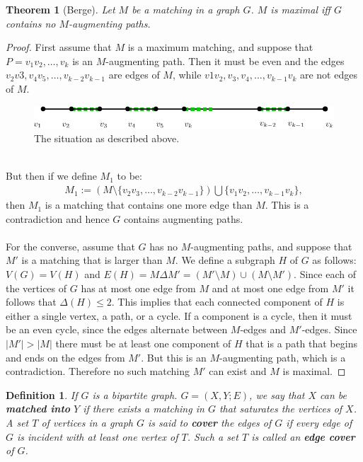 \documentclass[12pt,a4paper]{article}
\newtheorem{thm}{Theorem}[section]
\newtheorem{defn}{Definition}[section]
\theoremstyle{definition}
\begin{document}
\newpage
\begin{thm}[Berge] Let $M$ be a matching in a graph $G$. $M$ is maximal iff $G$ contains no $M$-augmenting paths. 
\end{thm}
\begin{proof}
First assume that $M$ is a maximum matching, and suppose that $P=v_1v_2, \dots , v_k$ is an $M$-augmenting path. Then it must be even and the edges $v_2v3,v_4v_5,\dots,v_{k-2}v_{k-1}$ are edges of $M$, while $v1v_2,v_3,v_4, \dots ,  v_{k-1}v_k$ are not edges of $M$. 
\\
\begin{figure}[hbtp]
\centering
\includegraphics[scale=.9]{images/graph43.pdf}
\caption{The situation as described above.}
\end{figure}
\\
But then if we define $M_1$ to be:
\begin{align*}
M_1:= ( M \setminus \{ v_2v_3, \dots , v_{k-2}v_{k-1}\} ) \bigcup \{ v_1v_2, \dots , v_{k-1}v_k\},
\end{align*}
then $M_1$ is a matching that contains one more edge than $M$. This is a contradiction and hence $G$ contains augmenting paths. 
\\\\
For the converse, assume that $G$ has no $M$-augmenting paths, and suppose that $M'$ is a matching that is larger than $M$. We define a subgraph $H$ of $G$ as follows: $V(G)=V(H)$ and $E(H)= M \Delta M'= (M' \setminus M) \cup (M \setminus M')$. Since each of the vertices of $G$ has at most one edge from $M$ and at most one edge from $M'$ it follows that $\Delta(H) \leq 2$. This implies that each connected component of $H$ is either a single vertex, a path, or a cycle. If a component is a cycle, then it must be an even cycle, since the edges alternate between $M$-edges and $M'$-edges. Since $|M'| >|M|$ there must be at least one component of $H$ that is a path that begins and ends on the edges from $M'$. But this is an $M$-augmenting path, which is a contradiction. Therefore no such matching $M'$ can exist and $M$ is maximal. 
\end{proof}
\newpage
\begin{defn} If $G$ is a bipartite graph. $G=(X,Y;E)$, we say that $X$ can be \textbf{matched into} $Y$ if there exists a matching in $G$ that saturates the vertices of $X$. A set $T$ of vertices in a graph $G$ is said to \textbf{cover} the edges of $G$ if every edge of $G$ is incident with at least one vertex of $T$. Such a set $T$ is called an \textbf{edge cover} of $G$.
\end{defn}
\end{document}
